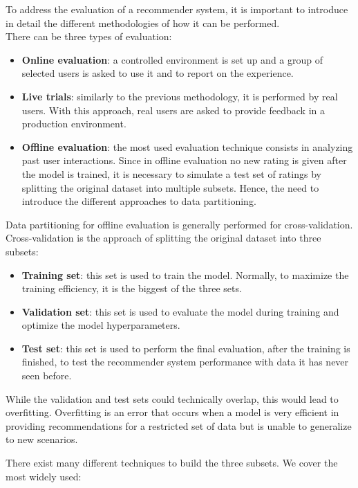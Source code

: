 To address the evaluation of a recommender system, it is important to introduce in detail the different methodologies of how it can be performed.\\
There can be three types of evaluation:
\begin{itemize}
\item \textbf{Online evaluation}: a controlled environment is set up and a group of selected users is asked to use it and to report on the experience.
\item \textbf{Live trials}: similarly to the previous methodology, it is performed by real users. With this approach, real users are asked to provide feedback in a production environment.
\item \textbf{Offline evaluation}: the most used evaluation technique consists in analyzing past user interactions. Since in offline evaluation no new rating is given after the model is trained, it is necessary to simulate a test set of ratings by splitting the original dataset into multiple subsets. Hence, the need to introduce the different approaches to data partitioning.
\end{itemize}\par
Data partitioning for offline evaluation is generally performed for cross-validation. Cross-validation is the approach of splitting the original dataset into three subsets:
\begin{itemize}
\item \textbf{Training set}: this set is used to train the model. Normally, to maximize the training efficiency, it is the biggest of the three sets.
\item \textbf{Validation set}: this set is used to evaluate the model during training and optimize the model hyperparameters.
\item \textbf{Test set}: this set is used to perform the final evaluation, after the training is finished, to test the recommender system performance with data it has never seen before.
\end{itemize}
While the validation and test sets could technically overlap, this would lead to overfitting. Overfitting is an error that occurs when a model is very efficient in providing recommendations for a restricted set of data but is unable to generalize to new scenarios.\par
There exist many different techniques to build the three subsets. We cover the most widely used:

